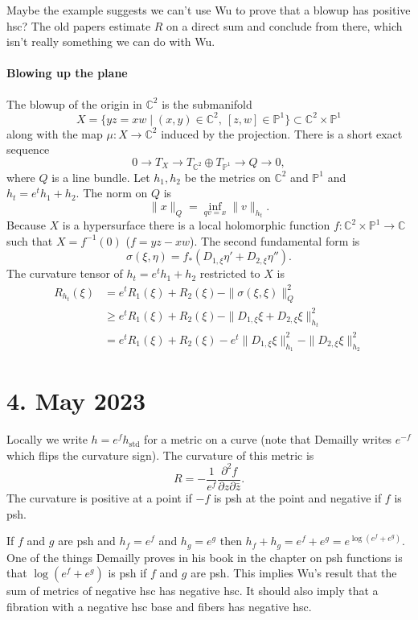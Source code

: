 \documentclass[11pt]{amsart}
\theoremstyle{definition}
\newcommand{\kk}[1]{\mathbb{#1}}
\begin{document}
Maybe the example suggests we can't use
Wu to prove that a blowup has positive hsc?
The old papers estimate $R$ on a direct sum and conclude from there, which
isn't really something we can do with Wu.


\paragraph{Blowing up the plane}

The blowup of the origin in $\kk C^2$ is the submanifold
$$
X
= \{ y z = x w \mid (x, y) \in \kk C^2, \ [z,w] \in \kk P^1 \}
\subset \kk C^2 \times \kk P^1
$$
along with the map $\mu : X \to \kk C^2$ induced by the projection.
There is a short exact sequence
$$
0 \to T_X \to T_{\kk C^2} \oplus T_{\kk P^1} \to Q \to 0,
$$
where $Q$ is a line bundle.
Let $h_1, h_2$ be the metrics on $\kk C^2$ and $\kk P^1$ and $h_t = e^t h_1 + h_2$.
The norm on $Q$ is
$$
\|x\|_Q = \inf_{q v = x} \| v \|_{h_t}.
$$
Because $X$ is a hypersurface there is a local holomorphic function $f : \kk
C^2 \times \kk P^1 \to \kk C$ such that $X = f^{-1}(0)$ ($f = yz - xw$).
The second fundamental form is
$$
\sigma(\xi, \eta)
= f_*(D_{1,\xi} \eta' + D_{2,\xi} \eta'').
$$
The curvature tensor of $h_t = e^t h_1 + h_2$ restricted to $X$ is
\begin{align*}
R_{h_t}(\xi)
&= e^t R_1(\xi) + R_2(\xi) - \|\sigma(\xi, \xi)\|_Q^2
\\
&\geq e^t R_1(\xi) + R_2(\xi) - \|D_{1,\xi}\xi + D_{2,\xi} \xi\|_{h_t}^2
\\
&= e^t R_1(\xi) + R_2(\xi) -
e^t \|D_{1,\xi}\xi\|_{h_1}^2 - \| D_{2,\xi} \xi\|_{h_2}^2
\end{align*}


\section{4. May 2023}

Locally we write $h = e^f h_{\text{std}}$ for a metric on a curve (note that
Demailly writes $e^{-f}$ which flips the curvature sign).
The curvature of this metric is
$$
R = -\frac{1}{e^f} \frac{\partial^2 f}{\partial z \partial \bar z}.
$$
The curvature is positive at a point if $-f$ is psh at the point and negative
if $f$ is psh.

If $f$ and $g$ are psh and $h_f = e^f$ and $h_g = e^g$ then $h_f + h_g = e^f +
e^g = e^{\log(e^f + e^g)}$.
One of the things Demailly proves in his book in the chapter on psh functions
is that $\log(e^f + e^g)$ is psh if $f$ and $g$ are psh.
This implies Wu's result that the sum of metrics of negative hsc has negative hsc.
It should also imply that a fibration with a negative hsc base and fibers has
negative hsc.
\end{document}
